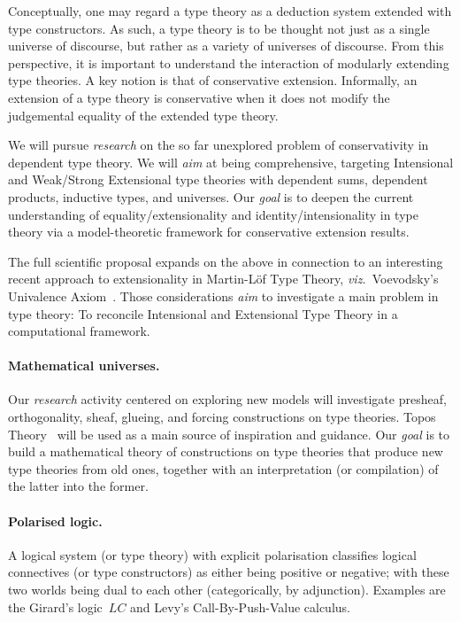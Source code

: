 \documentclass[11pt,twocolumn]{article}
\newcommand{\hl}{\emph}
\newcommand{\viz}{\emph{viz.}}
\newcommand{\LC}{\mbox{$LC$}}
\begin{document}
Conceptually, one may regard a type theory as a deduction system extended with
type constructors.  As such, a type theory is to be thought not just as a
single universe of discourse, but rather as a variety of universes of
discourse.  From this perspective, it is important to understand the
interaction of modularly extending type theories.  A key notion is that of
conservative extension.  Informally, an extension of a type theory is
conservative when it does not modify the judgemental equality of the extended
type theory.

We will pursue \hl{research} on the so far unexplored problem of
conservativity in dependent type theory.  We will \hl{aim} at being
comprehensive, targeting Intensional and Weak/Strong Extensional type theories
with dependent sums, dependent products, inductive types, and universes.  Our
\hl{goal} is to deepen the current understanding of equality/extensionality
and identity/intensionality in type theory via a model-theoretic framework for
conservative extension results.  

The full scientific proposal expands on the above in connection to an
interesting recent approach to extensionality in Martin-L\"of Type Theory,
\viz~Voevodsky's Univalence Axiom~\cite{UnivalentProgramme}.  Those
considerations \hl{aim} to investigate a main problem in type theory: To
reconcile Intensional and Extensional Type Theory in a computational
framework.

\paragraph{Mathematical universes.}
\label{MethodologyMathematicalUniversesParagraph}

Our \hl{research} activity centered on exploring new models will investigate
pre\-sheaf, orthogonality, sheaf, glueing, and forcing constructions on type
theories.  Topos Theory~\cite{Elephant} will be used as a main source of
inspiration and guidance.  Our \hl{goal} is to build a mathematical theory
of constructions on type theories that produce new type theories from old
ones, together with an interpretation (or compilation) of the latter into the
former.

\paragraph{Polarised logic.}
\label{PolarisationParagraph}

A logical system (or type theory) with explicit polarisation classifies
logical connectives (or type constructors) as either being positive or
negative; with these two worlds being dual to each other (categorically, by
adjunction).  Examples are the Girard's logic~{\LC} %
and Levy's Call-By-Push-Value calculus. %
\end{document}
